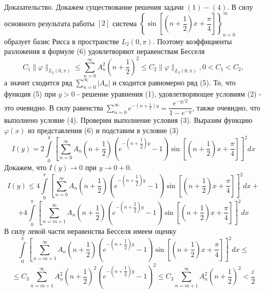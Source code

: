 \documentclass[a4paper, 9pt]{article}
\begin{document}
	\par
	Доказательство. Докажем существование решения задачи $(1) - (4)$. В силу основного результата работы $[2]$ система  $\left\{\sin{\left[\left(n + \dfrac12\right)x + \dfrac\pi4\right]}\right\}_{n=0}^{\infty}$ образует базис Рисса в пространстве $L_2(0, \pi)$. Поэтому коэффициенты разложения в формуле (6) удовлетворяют неравенствам Бесселя
	\begin{equation*}
		C_1 \|\varphi \|_{L_2(0,\pi)} \leq \sum\limits_{n=0}^{\infty} A_n^2 \left(n + \dfrac12\right)^2 \leq C_2 \|\varphi \|_{L_2(0,\pi)} , 0 < C_1 < C_2, 
	\end{equation*}
	а значит сходится ряд $\sum\limits_{n=0}^{\infty} |A_n|$ и сходится равномерно ряд (5). То, что функция (5) при $y > 0$ - решение уравнения (1), удовлетворяющее условиям (2) - это очевидно. В силу равенства $\sum\limits_{n=0}^{\infty} e^{-\left(n + \frac12\right)y} = \dfrac{e^{-y/2}}{1 - e^{-y}}$, также очевидно, что выполнено условие (4). Проверим выполнение условия (3).\newline
	Выразим функцию $\varphi(x)$ из представления (6) и подставим в условие (3)
	\begin{equation*}
		I(y) =  2 \int\limits_0^\pi \left[	\sum\limits_{n=0}^{\infty} A_n\left(n+\dfrac12\right) \left( e^{-\left(n+\dfrac12\right)y} - 1\right) \sin{\left[\left(n+\dfrac12\right) x  + \dfrac\pi4\right]} \right]^2 dx
	\end{equation*}
	Докажем, что $I(y) \to 0$ при $y \to 0+0$. 
	\begin{equation*}
		I(y) \leq 4\int\limits_0^\pi \left[	\sum\limits_{n=0}^{m} A_n\left(n+\dfrac12\right) \left( e^{-\left(n+\dfrac12\right)y} - 1\right) \sin{\left[\left(n+\dfrac12\right) x  + \dfrac\pi4\right]} \right]^2 dx + 
	\end{equation*}
	\begin{equation*}
		+ 4\int\limits_0^\pi \left[	\sum\limits_{n=m+1}^{\infty} A_n\left(n+\dfrac12\right) \left( e^{-\left(n+\dfrac12\right)y} - 1\right) \sin{\left[\left(n+\dfrac12\right) x  + \dfrac\pi4\right]} \right]^2 dx
	\end{equation*}
	В силу левой части неравенства Бесселя имеем оценку
	\begin{equation*}
		\int\limits_0^\pi \left[	\sum\limits_{n=m+1}^{\infty} A_n\left(n+\dfrac12\right) \left( e^{-\left(n+\dfrac12\right)y} - 1\right) \sin{\left[\left(n+\dfrac12\right) x  + \dfrac\pi4\right]} \right]^2 dx \leq 
	\end{equation*}
	\begin{equation*}
		\leq  C_3 \sum\limits_{n=m+1}^{\infty} A_n^2 \left(n+\dfrac12\right)^2 \left(e^{-\left(n+\dfrac12\right)y} - 1\right)^2 \leq C_3 \sum\limits_{n=m+1}^{\infty} A_n^2 \left(n+\dfrac12\right)^2 < \dfrac{\varepsilon}{2}
	\end{equation*}
\end{document}
